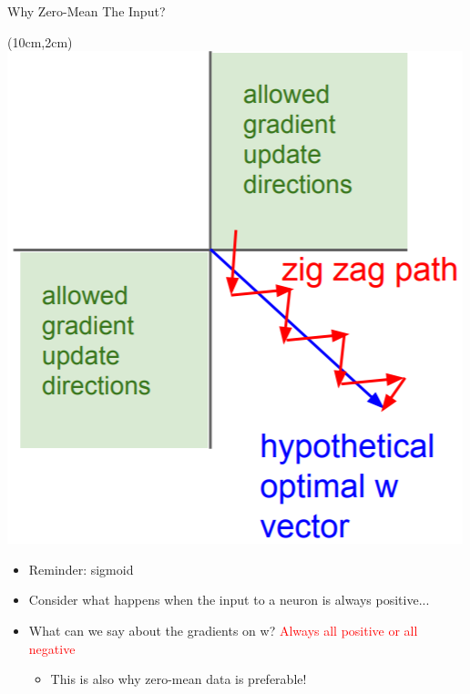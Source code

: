 \documentclass[serif, aspectratio=169]{beamer}
\begin{document}
\begin{frame}{Why Zero-Mean The Input?}

	\begin{textblock*}{5cm}(10cm,2cm) %
		\includegraphics[keepaspectratio, scale=0.3]{pic/zigzag}
	\end{textblock*}

	\begin{itemize}
		\item Reminder: sigmoid
		\item Consider what happens when the input \newline to a neuron is always positive...
		\item What can we say about the gradients on w? \newline \textcolor{red}{Always all positive or all negative}
		\begin{itemize}
			\item This is also why zero-mean data is preferable!
		\end{itemize}
	\end{itemize}
	
\end{frame}
\end{document}
